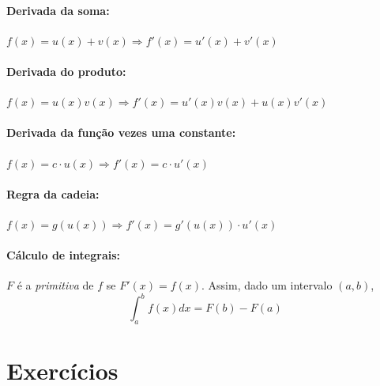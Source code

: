 \documentclass{article}
\begin{document}
\paragraph{Derivada da soma:} $f(x) = u(x) + v(x) \Rightarrow f'(x) = u'(x) + v'(x)$

\paragraph{Derivada do produto:} $f(x) = u(x) v(x) \Rightarrow f'(x) = u'(x)v(x) + u(x) v'(x)$

\paragraph{Derivada da função vezes uma constante:} $f(x) = c \cdot u(x) \Rightarrow f'(x) = c \cdot u'(x)$

\paragraph{Regra da cadeia:} $f(x) = g(u(x)) \Rightarrow f'(x) = g'(u(x)) \cdot u'(x)$

\paragraph{Cálculo de integrais:} $F$ é a {\em primitiva} de $f$ se $F'(x) = f(x)$. Assim, dado um intervalo $(a,b)$, 
$$
\int_a^b f(x)dx = F(b) - F(a)
$$


\vspace{1em}

\section*{Exercícios}
\end{document}
